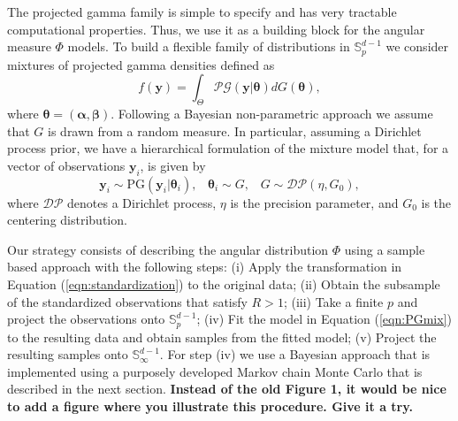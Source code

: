   The projected gamma family is simple to specify and has very tractable computational properties. Thus, we use it as a building block for the angular measure $\Phi$ models. To build a flexible family of distributions in ${\mathbb S}_p^{d-1}$ we consider mixtures of projected gamma densities defined as
  \begin{equation} \label{eqn:PGmix}     
     f(\bm{y}) = \int_\Theta \mathcal{PG}(\bm{y}|\bm{\theta}) dG(\bm{\theta}), 
  \end{equation} 
  where $\bm{\theta} = (\bm{\alpha}, \bm{\beta})$. Following a Bayesian non-parametric approach \citep{Ferguson74,Antoniak1974} we assume that $G$ is drawn from a random measure. In particular, assuming a Dirichlet process prior, we have a hierarchical formulation of the mixture model that, for a vector of observations $\bm{y}_i$, is given by
  \begin{equation}\label{eqn:dppg}    \bm{y}_i \sim \text{PG}(\bm{y}_i|\bm{\theta}_i) , \;\;\; \bm{\theta}_i \sim G, \;\;\; G \sim \mathcal{DP}(\eta, G_0),
  \end{equation}
  where $\mathcal{DP}$ denotes a Dirichlet process, $\eta$ is the precision parameter, and $G_0$ is the centering distribution. 
  
  Our strategy consists of describing the angular distribution $\Phi$ using a sample based approach with the following steps: (i) Apply the transformation in Equation (\ref{eqn:standardization}) to the original data; (ii) Obtain the subsample of the standardized observations that satisfy $R>1$; (iii) Take a finite $p$ and project the observations onto ${\mathbb S}_p^{d-1}$; (iv) Fit the model in Equation (\ref{eqn:PGmix}) to the resulting data and obtain samples from the fitted model; (v) Project the resulting samples onto ${\mathbb S}_\infty^{d-1}$.
  For step (iv) we use a Bayesian approach that is implemented using a purposely developed Markov chain Monte Carlo that is described in the next section. 
  {\bf Instead of the old Figure 1, it would be nice to add a figure where you illustrate this procedure. Give it a try.}

